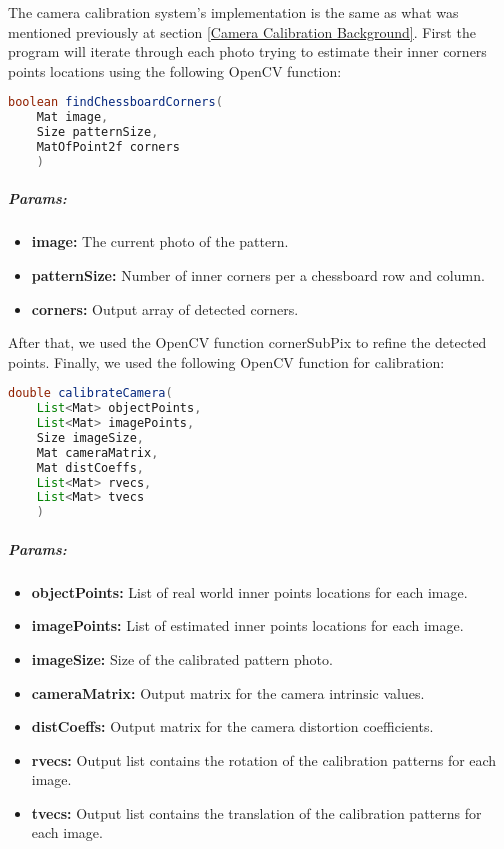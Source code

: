 The camera calibration system's implementation is the same as what was mentioned previously at section \ref{Camera Calibration Background}. First the program will iterate through each photo trying to estimate their inner corners points locations using the following OpenCV function:
\begin{lstlisting}[language=Java]
	boolean findChessboardCorners(
	Mat image,
	Size patternSize,
	MatOfPoint2f corners
	)
\end{lstlisting}

\subparagraph{Params:}

\begin{itemize}
	\item \textbf{image:}
	The current photo of the pattern.
	\item \textbf{patternSize:}
	Number of inner corners per a chessboard row and column.
	\item \textbf{corners:}
	Output array of detected corners.
\end{itemize}

After that, we used the OpenCV function cornerSubPix to refine the detected points. Finally, we used the following OpenCV function for calibration:
\begin{lstlisting}[language=Java]
	double calibrateCamera(
	List<Mat> objectPoints,
	List<Mat> imagePoints, 
	Size imageSize, 
	Mat cameraMatrix, 
	Mat distCoeffs, 
	List<Mat> rvecs, 
	List<Mat> tvecs
	)
\end{lstlisting}

\subparagraph{Params:}

\begin{itemize}
	\item \textbf{objectPoints:}
	List of real world inner points locations for each image.
	\item \textbf{imagePoints:}
	List of estimated inner points locations for each image.
	\item \textbf{imageSize:}
	Size of the calibrated pattern photo.
	\item \textbf{cameraMatrix:}
	Output matrix for the camera intrinsic values.
	\item \textbf{distCoeffs:}
	Output matrix for the camera distortion coefficients.
	\item \textbf{rvecs:}
	Output list contains the rotation of the calibration patterns for each image.
	\item \textbf{tvecs:}
	Output list contains the translation of the calibration patterns for each image.
\end{itemize}

